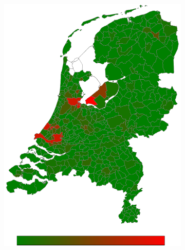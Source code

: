 \documentclass[a4paper,twoside,11pt]{article}
\begin{document}
\begin{figure}[h]
\begin{subfigure}[b]{0.118\textwidth}
                \includegraphics[width=\textwidth]{Heatmaps/HeatMap10.png}
                \caption{}
                \label{fig:Surinames}
        \end{subfigure}
        \begin{subfigure}[b]{0.118\textwidth}

\end{subfigure}
\end{figure}
\end{document}
